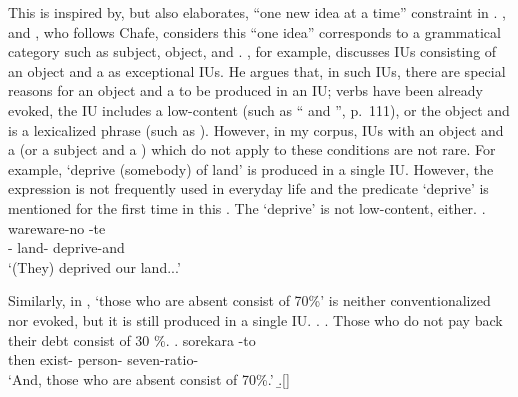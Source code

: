 This is inspired by, but also elaborates, ``one new idea at a time'' constraint in .
, and , who follows Chafe,
considers this ``one idea'' corresponds to a grammatical category such as subject, object, and .
, for example, discusses IUs consisting of an object and a  as exceptional IUs.
He argues that,
in such IUs,
there are special reasons for an object and a  to be produced in an IU;
verbs have been already evoked,
the IU includes a low-content  (such as `` and '', p.~111), or
the object and  is a lexicalized phrase (such as ).
However, in my corpus,
IUs with an object and a  (or a subject and a ) which do not apply
to these conditions are not rare.
For example,
 `deprive (somebody) of land'
is produced in a single IU.
However, the expression is not frequently used in everyday life
and the predicate  `deprive' is mentioned for the first time in this .
The   `deprive' is not low-content, either.
%
\exg. wareware-no {\iub}  -te {\iub} \\
      - {} land- deprive-and {} \\
      `(They) deprived our land...'

Similarly, in \Next[b],
 `those who are absent consist of 70\%'
is neither conventionalized nor evoked,
but it is still produced in a single IU.
%
\ex.
 \a. Those who do not pay back their debt consist of 30 \%.
 \bg. sorekara {\iub}   -to {\iub} \\
      then {} exist- person- seven-ratio- {} \\
      `And, those who are absent consist of 70\%.'
 \b.[] 

